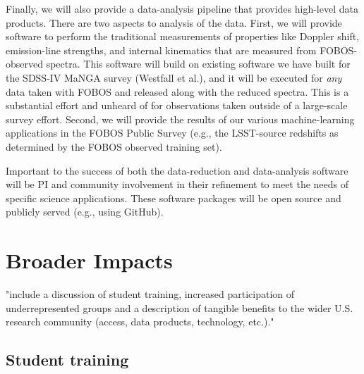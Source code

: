 \documentclass[oneside,11pt]{amsart}
\newcommand{\comment}[2][todo]{{\color{#1}[[{\bf #2}]]}}
\begin{document}
Finally, we will also provide a data-analysis pipeline that provides
high-level data products.  There are two aspects to analysis of the
data.  First, we will provide software to perform the traditional
measurements of properties like Doppler shift, emission-line strengths,
and internal kinematics that are measured from FOBOS-observed spectra.
This software will build on existing software we have built for the
SDSS-IV MaNGA survey (Westfall et al.), and it will be executed for {\it
any} data taken with FOBOS and released along with the reduced spectra.
This is a substantial effort and unheard of for observations taken
outside of a large-scale survey effort.  Second, we will provide the
results of our various machine-learning applications in the FOBOS Public
Survey (e.g., the LSST-source redshifts as determined by the FOBOS
observed training set).

Important to the success of both the data-reduction and data-analysis
software will be PI and community involvement in their refinement to
meet the needs of specific science applications.  These software
packages will be open source and publicly served (e.g., using GitHub).


\section{Broader Impacts}
\label{sec:bi}

"include a discussion of student training, increased participation of
underrepresented groups and a description of tangible benefits to the
wider U.S. research community (access, data products, technology,
etc.)."

\subsection{Student training}
\label{sec:training}
\noindent \comment{1/4 page}
\end{document}
